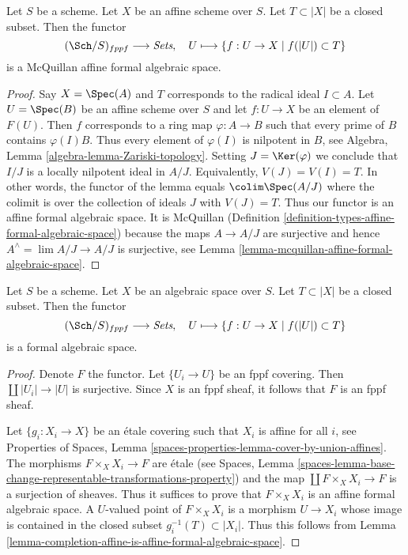 \begin{lemma}
\label{lemma-completion-affine-is-affine-formal-algebraic-space}
Let $S$ be a scheme. Let $X$ be an affine scheme over $S$.
Let $T \subset |X|$ be a closed subset. Then the functor
$$
(\Sch/S)_{fppf} \longrightarrow \textit{Sets},\quad
U \longmapsto \{f : U \to X \mid f(|U|) \subset T\}
$$
is a McQuillan affine formal algebraic space.
\end{lemma}

\begin{proof}
Say $X = \Spec(A)$ and $T$ corresponds to the radical ideal $I \subset A$.
Let $U = \Spec(B)$ be an affine scheme over $S$ and let
$f : U \to X$ be an element of $F(U)$. Then $f$ corresponds to a
ring map $\varphi : A \to B$ such that every prime of $B$ contains
$\varphi(I) B$. Thus every element of $\varphi(I)$ is nilpotent in $B$, see
Algebra, Lemma \ref{algebra-lemma-Zariski-topology}.
Setting $J = \Ker(\varphi)$ we conclude that $I/J$ is a locally nilpotent
ideal in $A/J$. Equivalently, $V(J) = V(I) = T$.
In other words, the functor of the lemma equals
$\colim \Spec(A/J)$ where the colimit is over the
collection of ideals $J$ with $V(J) = T$.
Thus our functor is an affine formal algebraic space. It is McQuillan
(Definition \ref{definition-types-affine-formal-algebraic-space})
because the maps $A \to A/J$ are surjective
and hence $A^\wedge = \lim A/J \to A/J$ is surjective, see
Lemma \ref{lemma-mcquillan-affine-formal-algebraic-space}.
\end{proof}

\begin{lemma}
\label{lemma-completion-is-formal-algebraic-space}
Let $S$ be a scheme. Let $X$ be an algebraic space over $S$.
Let $T \subset |X|$ be a closed subset. Then the functor
$$
(\Sch/S)_{fppf} \longrightarrow \textit{Sets},\quad
U \longmapsto \{f : U \to X \mid f(|U|) \subset T\}
$$
is a formal algebraic space.
\end{lemma}

\begin{proof}
Denote $F$ the functor. Let $\{U_i \to U\}$ be an fppf covering.
Then $\coprod |U_i| \to |U|$ is surjective. Since $X$ is an fppf
sheaf, it follows that $F$ is an fppf sheaf.

\medskip\noindent
Let $\{g_i : X_i \to X\}$ be an \'etale covering such that $X_i$ is affine
for all $i$, see Properties of Spaces, Lemma
\ref{spaces-properties-lemma-cover-by-union-affines}.
The morphisms $F \times_X X_i \to F$ are \'etale
(see Spaces, Lemma
\ref{spaces-lemma-base-change-representable-transformations-property})
and the map $\coprod F \times_X X_i \to F$ is a surjection of sheaves.
Thus it suffices to prove that $F \times_X X_i$ is an affine formal
algebraic space. A $U$-valued point of $F \times_X X_i$ is a
morphism $U \to X_i$ whose image is contained in the closed subset
$g_i^{-1}(T) \subset |X_i|$. Thus this follows from
Lemma \ref{lemma-completion-affine-is-affine-formal-algebraic-space}.
\end{proof}

